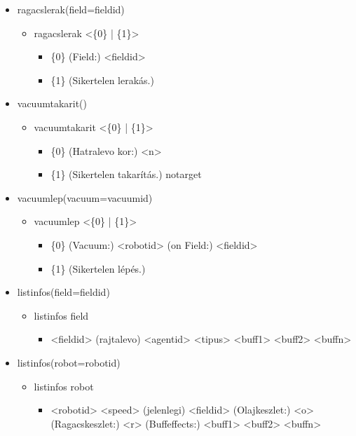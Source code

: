 \begin{itemize}
	\item ragacslerak(field=fieldid) 
	\begin{itemize}
		\item ragacslerak  <\{0\} | \{1\}>
		\begin{itemize}
			\item \{0\} (Field:) <fieldid> 
			\item \{1\} (Sikertelen lerakás.)
		\end{itemize}
	\end{itemize}		
	
	\item vacuumtakarit()
	\begin{itemize}
		\item vacuumtakarit  <\{0\} | \{1\}>
		\begin{itemize}
			\item \{0\} (Hatralevo kor:) <n>
			\item \{1\} (Sikertelen takarítás.) notarget
		\end{itemize}
	\end{itemize}
	
	\item vacuumlep(vacuum=vacuumid)
	\begin{itemize}
		\item vacuumlep  <\{0\} | \{1\}>
		\begin{itemize}
			\item \{0\} (Vacuum:) <robotid> (on Field:) <fieldid> 
			\item \{1\} (Sikertelen lépés.)
		\end{itemize}
	\end{itemize}	
	
	\item listinfos(field=fieldid)
	\begin{itemize}
		\item listinfos field
		\begin{itemize}
			\item <fieldid> (rajtalevo) <agentid> <tipus> <buff1> <buff2> <buffn> 
		\end{itemize}
	\end{itemize}	
	
	\item listinfos(robot=robotid)
	\begin{itemize}
		\item listinfos robot
		\begin{itemize}
			\item <robotid> <speed> (jelenlegi) <fieldid> (Olajkeszlet:) <o> (Ragacskeszlet:) <r> (Buffeffects:) <buff1> <buff2> <buffn> 
		\end{itemize}
	\end{itemize}	
	

\end{itemize}
